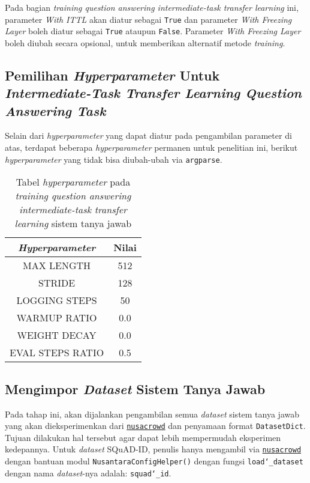 Pada bagian \emph{training question answering intermediate-task transfer learning} ini, parameter \emph{With ITTL} akan diatur sebagai \texttt{True} dan parameter \emph{With Freezing Layer} boleh diatur sebagai \texttt{True} ataupun \texttt{False}. Parameter \emph{With Freezing Layer} boleh diubah secara opsional, untuk memberikan alternatif metode \emph{training}.

\subsection{Pemilihan \emph{Hyperparameter} Untuk \emph{Intermediate-Task Transfer Learning Question Answering Task}}
Selain dari \emph{hyperparameter} yang dapat diatur pada pengambilan parameter di atas, terdapat beberapa \emph{hyperparameter} permanen untuk penelitian ini, berikut \emph{hyperparameter} yang tidak bisa diubah-ubah via \texttt{argparse}.

\begin{table}[h]
\centering
\begin{tabular}{||c | c||} 
 \hline\hline
 \emph{Hyperparameter} & Nilai \\ [0.5ex] 
 \hline\hline
 MAX LENGTH & 512 \\ 
 STRIDE & 128 \\
 LOGGING STEPS & 50 \\
 WARMUP RATIO & 0.0 \\
 WEIGHT DECAY & 0.0 \\ 
 EVAL STEPS RATIO & 0.5 \\ [1ex] 
 \hline\hline
\end{tabular}
\caption{Tabel \emph{hyperparameter} pada \emph{training question answering} \emph{intermediate-task transfer learning} sistem tanya jawab}
\end{table}

\subsection{Mengimpor \emph{Dataset} Sistem Tanya Jawab}
Pada tahap ini, akan dijalankan pengambilan semua \emph{dataset} sistem tanya jawab yang akan dieksperimenkan dari \href{https://github.com/IndoNLP/nusa-crowd/tree/master/nusacrowd/nusa_datasets/}{\texttt{nusacrowd}} dan penyamaan format \texttt{DatasetDict}. Tujuan dilakukan hal tersebut agar dapat lebih mempermudah eksperimen kedepannya. Untuk \emph{dataset} SQuAD-ID, penulis hanya mengambil via \href{https://github.com/IndoNLP/nusa-crowd/tree/master/nusacrowd/nusa_datasets/}{\texttt{nusacrowd}} dengan bantuan modul \texttt{NusantaraConfigHelper()} dengan fungsi \texttt{load\char`_dataset} dengan nama \emph{dataset}-nya adalah: \texttt{squad\char`_id}. 

